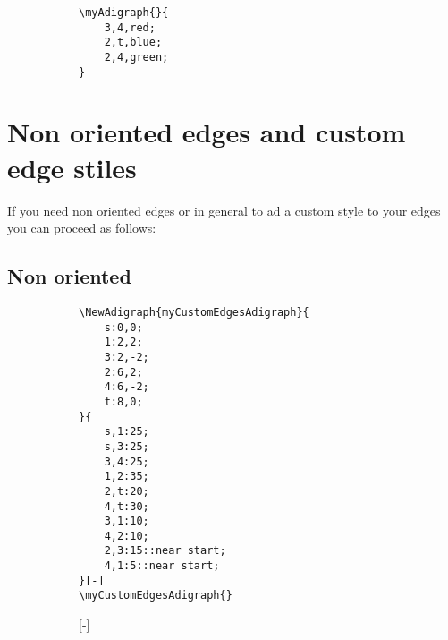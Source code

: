 \documentclass{report}
\begin{document}
\begin{figure}
	\begin{subfigure}{0.49\textwidth}
		\begin{verbatim}
\myAdigraph{}{
	3,4,red;
	2,t,blue;
	2,4,green;
}
\end{verbatim}
	\end{subfigure}
	\begin{subfigure}{0.49\textwidth}
	\end{subfigure}
\end{figure}

\section{Non oriented edges and custom edge stiles}
If you need non oriented edges or in general to ad a custom style to your edges you can proceed as follows:
\subsection{Non oriented}
\begin{figure}
	\begin{subfigure}{0.49\textwidth}
		\begin{verbatim}
\NewAdigraph{myCustomEdgesAdigraph}{
	s:0,0;
	1:2,2;
	3:2,-2;
	2:6,2;
	4:6,-2;
	t:8,0;
}{
	s,1:25;
	s,3:25;
	3,4:25;
	1,2:35;
	2,t:20;
	4,t:30;
	3,1:10;
	4,2:10;
	2,3:15::near start;
	4,1:5::near start;
}[-]
\myCustomEdgesAdigraph{}
\end{verbatim}
	\end{subfigure}
	\begin{subfigure}{0.49\textwidth}
		[-]
		\myCustomEdgesAdigraph{}
	\end{subfigure}
\end{figure}
\end{document}
